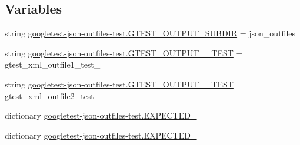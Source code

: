\subsection*{Variables}
\begin{DoxyCompactItemize}
\item 
string \mbox{\hyperlink{namespacegoogletest-json-outfiles-test_a0f92f4080118c9ed4fce7412abfabf57}{googletest-\/json-\/outfiles-\/test.\+G\+T\+E\+S\+T\+\_\+\+O\+U\+T\+P\+U\+T\+\_\+\+S\+U\+B\+D\+IR}} = \textquotesingle{}json\+\_\+outfiles\textquotesingle{}
\item 
string \mbox{\hyperlink{namespacegoogletest-json-outfiles-test_ace9d5d61931b94cde9f088c67c08089d}{googletest-\/json-\/outfiles-\/test.\+G\+T\+E\+S\+T\+\_\+\+O\+U\+T\+P\+U\+T\+\_\+\_\+\+T\+E\+ST}} = \textquotesingle{}gtest\+\_\+xml\+\_\+outfile1\+\_\+test\+\_\+\textquotesingle{}
\item 
string \mbox{\hyperlink{namespacegoogletest-json-outfiles-test_af99178050ea2a9feaf2d569fcb5c3dae}{googletest-\/json-\/outfiles-\/test.\+G\+T\+E\+S\+T\+\_\+\+O\+U\+T\+P\+U\+T\+\_\+\_\+\+T\+E\+ST}} = \textquotesingle{}gtest\+\_\+xml\+\_\+outfile2\+\_\+test\+\_\+\textquotesingle{}
\item 
dictionary \mbox{\hyperlink{namespacegoogletest-json-outfiles-test_abf0c05f9a69a87f8625d3dd90cc16ed8}{googletest-\/json-\/outfiles-\/test.\+E\+X\+P\+E\+C\+T\+E\+D\+\_}}
\item 
dictionary \mbox{\hyperlink{namespacegoogletest-json-outfiles-test_a4340a105b9ff2d4a132e85a8b6af7d61}{googletest-\/json-\/outfiles-\/test.\+E\+X\+P\+E\+C\+T\+E\+D\+\_}}
\end{DoxyCompactItemize}
